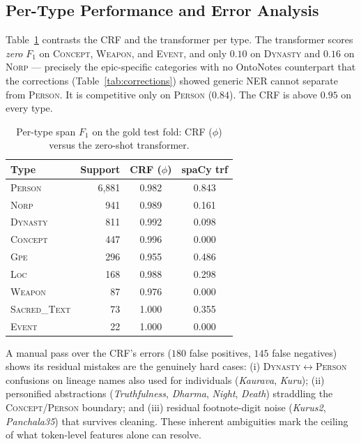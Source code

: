 \documentclass[conference]{IEEEtran}
\begin{document}
\subsection{Per-Type Performance and Error Analysis}
\label{sec:pertype}

Table~\ref{tab:perclass} contrasts the CRF and the transformer per type. The transformer scores \emph{zero} $F_1$ on \textsc{Concept}, \textsc{Weapon}, and \textsc{Event}, and only $0.10$ on \textsc{Dynasty} and $0.16$ on \textsc{Norp} --- precisely the epic-specific categories with no OntoNotes counterpart that the corrections (Table~\ref{tab:corrections}) showed generic NER cannot separate from \textsc{Person}. It is competitive only on \textsc{Person} ($0.84$). The CRF is above $0.95$ on every type.

\begin{table}[!t]
\centering
\caption{Per-type span $F_1$ on the gold test fold: CRF ($\phi$) versus the zero-shot transformer.}
\label{tab:perclass}
\small
\begin{tabular}{@{}l r c c@{}}
\toprule
\textbf{Type} & \textbf{Support} & \textbf{CRF ($\phi$)} & \textbf{spaCy trf} \\
\midrule
\textsc{Person}       & 6{,}881 & 0.982 & 0.843 \\
\textsc{Norp}         & 941     & 0.989 & 0.161 \\
\textsc{Dynasty}      & 811     & 0.992 & 0.098 \\
\textsc{Concept}      & 447     & 0.996 & 0.000 \\
\textsc{Gpe}          & 296     & 0.955 & 0.486 \\
\textsc{Loc}          & 168     & 0.988 & 0.298 \\
\textsc{Weapon}       & 87      & 0.976 & 0.000 \\
\textsc{Sacred\_Text} & 73      & 1.000 & 0.355 \\
\textsc{Event}        & 22      & 1.000 & 0.000 \\
\bottomrule
\end{tabular}
\end{table}

A manual pass over the CRF's errors ($180$ false positives, $145$ false negatives) shows its residual mistakes are the genuinely hard cases: (i) \textsc{Dynasty}$\leftrightarrow$\textsc{Person} confusions on lineage names also used for individuals (\emph{Kaurava}, \emph{Kuru}); (ii) personified abstractions (\emph{Truthfulness}, \emph{Dharma}, \emph{Night}, \emph{Death}) straddling the \textsc{Concept}/\textsc{Person} boundary; and (iii) residual footnote-digit noise (\emph{Kurus2}, \emph{Panchala35}) that survives cleaning. These inherent ambiguities mark the ceiling of what token-level features alone can resolve.
\end{document}
